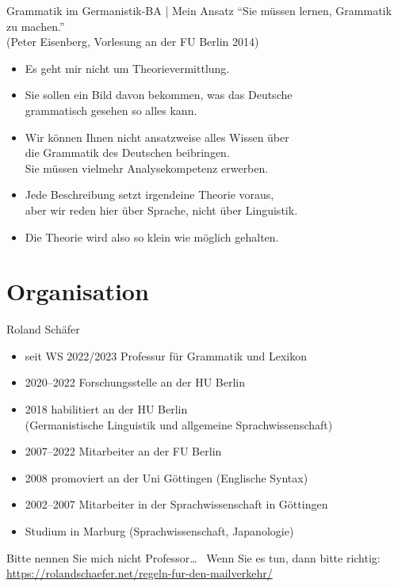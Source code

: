 
\begin{frame}
  {Grammatik im Germanistik-BA | Mein Ansatz}
  \onslide<+->
  \onslide<+->
  \alert{\Large "`Sie müssen lernen, Grammatik zu machen."'}\\
  (Peter Eisenberg, Vorlesung an der FU Berlin 2014)\\
  \Zeile
  \onslide<+->
  \begin{itemize}[<+->]
    \item Es geht mir nicht um Theorievermittlung.
    \item Sie sollen ein Bild davon bekommen, was das Deutsche\\
      grammatisch gesehen so alles kann.
    \item Wir können Ihnen nicht ansatzweise alles Wissen über\\
      die Grammatik des Deutschen beibringen.\\
      Sie müssen vielmehr \alert{Analysekompetenz} erwerben.
    \item Jede Beschreibung setzt irgendeine Theorie voraus,\\
      aber \alert{wir reden hier über Sprache, nicht über Linguistik}.
    \item Die Theorie wird also so klein wie möglich gehalten.
  \end{itemize}
\end{frame}

\section{Organisation}

\begin{frame}
  {Roland Schäfer}
  \onslide<+->
  \begin{itemize}[<+->]
    \item seit WS 2022\slash 2023 Professur für Grammatik und Lexikon
    \item 2020--2022 Forschungsstelle an der HU Berlin
    \item 2018 habilitiert an der HU Berlin\\
      (Germanistische Linguistik und allgemeine Sprachwissenschaft)
    \item 2007--2022 Mitarbeiter an der FU Berlin
    \item 2008 promoviert an der Uni Göttingen (Englische Syntax)
    \item 2002--2007 Mitarbeiter in der Sprachwissenschaft in Göttingen
    \item Studium in Marburg (Sprachwissenschaft, Japanologie)
  \end{itemize}
  \Zeile
  \onslide<+->
  Bitte nennen Sie mich nicht Professor\ldots\ \onslide<+-> Wenn Sie es tun, dann bitte richtig:\\
  \url{https://rolandschaefer.net/regeln-fur-den-mailverkehr/}
\end{frame}

